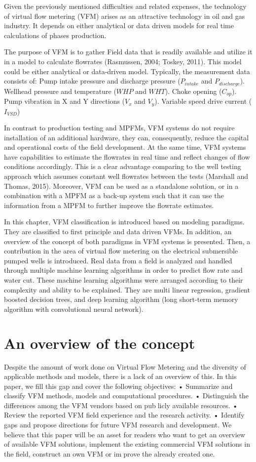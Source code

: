 Given the previously mentioned difficulties and related expenses, the technology of virtual flow metering (VFM) arises as an attractive technology in oil and gas industry. It depends on either analytical or data driven models for real time calculations of phases production.

The purpose of VFM is to gather Field data that is readily available and utilize it in a model to calculate flowrates (Rasmussen, 2004; Toskey, 2011). This model could be either analytical or data-driven model. Typically, the measurement data consists of: Pump intake pressure and discharge pressure ($P_{intake}$ and $P_{discharge}$). Wellhead pressure and temperature ($WHP$ and $WHT$). Choke opening ($C_{op}$). Pump vibration in X and Y directions ($V_x$ and $V_y$). Variable speed drive current ($I_{VSD}$)

In contrast to production testing and MPFMs, VFM systems do not require installation of an additional hardware, they can, consequently, reduce the capital and operational costs of the field development. At the same time, VFM systems have capabilities to estimate the flowrates in real time and reflect changes of flow conditions accordingly. This is a clear advantage comparing to the well testing approach which assumes constant well flowrates between the tests (Marshall and Thomas, 2015). Moreover, VFM can be used as a standalone solution, or in a combination with a MPFM as a back-up system such that it can use the information from a MPFM to further improve the flowrate estimates.  

In this chapter, VFM classification is introduced based on modeling paradigms. They are classified to first principle and data driven VFMs. In addition, an overview of the concept of both paradigms in VFM systems is presented. Then, a contribution in the area of virtual flow metering on the electrical submersible pumped wells is introduced. Real data from a field is analyzed and handled through multiple machine learning algorithms in order to predict flow rate and water cut. These machine learning algorithms were arranged according to their complexity and ability to be explained. They are multi linear regression, gradient boosted decision trees, and deep learning algorithm (long short-term memory algorithm with convolutional neural network). 

\section{An overview of the concept}
Despite the amount of work done on Virtual Flow Metering and the
diversity of applicable methods and models, there is a lack of an
overview of this. In this paper, we fill this gap and cover the following
objectives:
• Summarize and classify VFM methods, models and computational
procedures.
• Distinguish the differences among the VFM vendors based on publicly available resources.
• Review the reported VFM field experience and the research activity.
• Identify gaps and propose directions for future VFM research and
development.
We believe that this paper will be an asset for readers who want to
get an overview of available VFM solutions, implement the existing
commercial VFM solutions in the field, construct an own VFM or improve the already created one.


